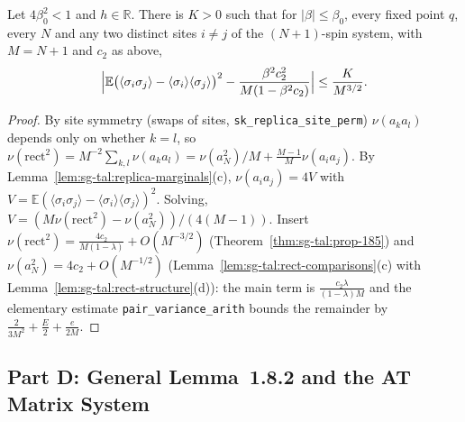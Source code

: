\begin{theorem}[Corollary~1.8.6, Eq.~(1.244)]
\label{cor:sg-tal:corollary-186}
  \leanok
{}
Let $4\beta_0^2<1$ and $h\in\mathbb R$.  There is $K>0$ such that for $|\beta|\le\beta_0$, every fixed point $q$, every $N$ and any two distinct sites $i\ne j$ of the $(N+1)$-spin system, with $M=N+1$ and $c_2$ as above,
\[
\Bigl|\mathbb E\bigl(\langle\sigma_i\sigma_j\rangle-\langle\sigma_i\rangle\langle\sigma_j\rangle\bigr)^2-\frac{\beta^2c_2^2}{M(1-\beta^2c_2)}\Bigr|\le\frac K{M^{3/2}}.
\]
\end{theorem}
\begin{proof}
  \leanok
By site symmetry (swaps of sites, \texttt{sk\_replica\_site\_perm}) $\nu(a_ka_l)$ depends only on whether $k=l$, so $\nu(\mathrm{rect}^2)=M^{-2}\sum_{k,l}\nu(a_ka_l)=\nu(a_N^2)/M+\frac{M-1}M\nu(a_ia_j)$.  By Lemma~\ref{lem:sg-tal:replica-marginals}(c), $\nu(a_ia_j)=4V$ with $V=\mathbb E(\langle\sigma_i\sigma_j\rangle-\langle\sigma_i\rangle\langle\sigma_j\rangle)^2$.  Solving, $V=(M\nu(\mathrm{rect}^2)-\nu(a_N^2))/(4(M-1))$.  Insert $\nu(\mathrm{rect}^2)=\frac{4c_2}{M(1-\lambda)}+O(M^{-3/2})$ (Theorem~\ref{thm:sg-tal:prop-185}) and $\nu(a_N^2)=4c_2+O(M^{-1/2})$ (Lemma~\ref{lem:sg-tal:rect-comparisons}(c) with Lemma~\ref{lem:sg-tal:rect-structure}(d)): the main term is $\frac{c_2\lambda}{(1-\lambda)M}$ and the elementary estimate \texttt{pair\_variance\_arith} bounds the remainder by $\frac2{3M^2}+\frac E2+\frac e{2M}$.
\end{proof}

\subsection{Part D: General Lemma~1.8.2 and the AT Matrix System}

